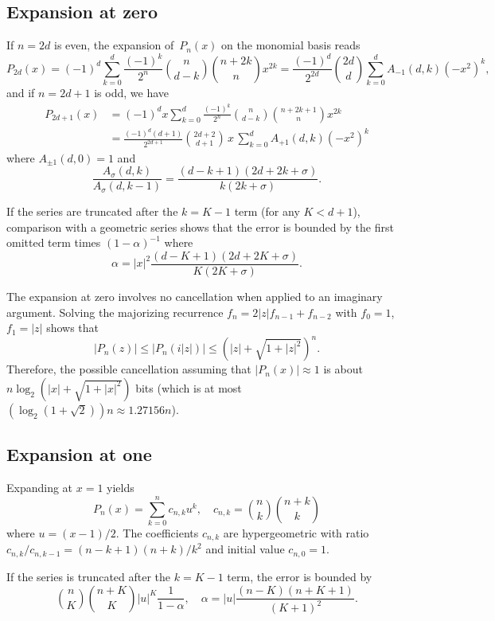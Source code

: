 \documentclass[11pt,a4paper]{article}
\begin{document}
\subsection{Expansion at zero}

If $n = 2d$ is even, the expansion of $P_n(x)$ on the monomial basis
reads
$$P_{2d}(x) = (-1)^d \sum_{k=0}^d \frac{(-1)^k}{2^n} {n \choose d-k} {n+2k \choose n} x^{2k} = \frac{(-1)^d}{2^{2d}} {2d \choose d} \sum_{k=0}^d A_{-1}(d,k) (-x^2)^k,$$
and if $n = 2d+1$ is odd, we have
\begin{align*}
P_{2d+1}(x) &= (-1)^d x \sum_{k=0}^d \frac{(-1)^k}{2^n} {n \choose d-k} {n+2k+1 \choose n} x^{2k} \\
&= \frac{(-1)^d (d+1)}{2^{2d+1}} {2d+2 \choose d+1} \,x\, \sum_{k=0}^d A_{+1}(d,k) (-x^2)^k
\end{align*}
where $A_{\pm 1}(d,0) = 1$ and
$$\frac{A_{\sigma}(d,k)}{A_{\sigma}(d,k-1)} = \frac{(d-k+1) (2d+2k+\sigma)}{k (2k+\sigma)}.$$

If the series are truncated after the $k = K - 1$ term
(for any $K < d + 1$), comparison with a geometric series
shows that the error is bounded by the first
omitted term times $(1-\alpha)^{-1}$
where
\begin{equation}
\label{eq:truncerr1}
\alpha = |x|^2 \frac{(d-K+1)(2d+2K+\sigma)}{K (2K+\sigma)}.
\end{equation}

The expansion at zero involves no cancellation
when applied to an imaginary argument.
Solving the majorizing recurrence $f_n = 2 |z| f_{n-1} + f_{n-2}$ with
$f_0 = 1$, $f_1 = |z|$ shows that
\[ |P_n(z)| \le |P_n(i|z|)| \le \left(|z| + \sqrt{1 + |z|^2}\right)^n. \]
Therefore, the possible cancellation assuming that $|P_n(x)| \approx 1$
is about $n \log_2(|x| + \sqrt{1 + |x|^2})$ bits
(which is at most $(\log_2 (1+\sqrt{2})) n \approx 1.27156n$).

\subsection{Expansion at one}

Expanding at $x = 1$ yields
$$P_n(x) = \sum_{k=0}^n c_{n,k} u^k, \quad c_{n,k} = {n \choose k} {n+k \choose k}$$
where $u = (x-1)/2$.
The coefficients $c_{n,k}$ are hypergeometric with
ratio $c_{n,k}/c_{n,k-1} = (n-k+1)(n+k)/k^2$
and initial value $c_{n,0} = 1$.

If the series is truncated after the $k = K - 1$ term,
the error is bounded by
\begin{equation}
\label{eq:truncerr2}
{n \choose K}{n+K \choose K} |u|^K \frac{1}{1-\alpha}, \quad \alpha = |u| \frac{(n-K)(n+K+1)}{(K+1)^2}.
\end{equation}
\end{document}
